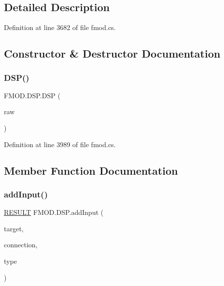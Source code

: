 \subsection{Detailed Description}


Definition at line 3682 of file fmod.\+cs.



\subsection{Constructor \& Destructor Documentation}
\mbox{\label{class_f_m_o_d_1_1_d_s_p_a11c85814080acca2c56be2f4bae6acb1}} 
\subsubsection{\texorpdfstring{D\+S\+P()}{DSP()}}
{\footnotesize\ttfamily F\+M\+O\+D.\+D\+S\+P.\+D\+SP (\begin{DoxyParamCaption}\item[{Int\+Ptr}]{raw }\end{DoxyParamCaption})}



Definition at line 3989 of file fmod.\+cs.



\subsection{Member Function Documentation}
\mbox{\label{class_f_m_o_d_1_1_d_s_p_a02a78c19ab1c921028035ec95f6ea653}} 
\subsubsection{\texorpdfstring{add\+Input()}{addInput()}}
{\footnotesize\ttfamily \hyperlink{namespace_f_m_o_d_a305d1176ef3f8c8815861a60407ac33d}{R\+E\+S\+U\+LT} F\+M\+O\+D.\+D\+S\+P.\+add\+Input (\begin{DoxyParamCaption}\item[{\hyperlink{class_f_m_o_d_1_1_d_s_p}{D\+SP}}]{target,  }\item[{out \hyperlink{class_f_m_o_d_1_1_d_s_p_connection}{D\+S\+P\+Connection}}]{connection,  }\item[{\hyperlink{namespace_f_m_o_d_abd730a6ff8b969c2f90d4123deb42aca}{D\+S\+P\+C\+O\+N\+N\+E\+C\+T\+I\+O\+N\+\_\+\+T\+Y\+PE}}]{type }\end{DoxyParamCaption})}



